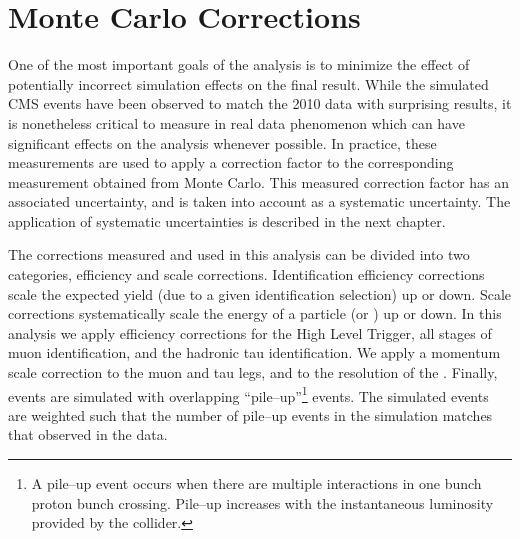 \ifx\master\undefined\fi 
%
\chapter{Monte Carlo Corrections} 
%
\label{ch:corrections} One of the most important goals of the analysis is to
minimize the effect of potentially incorrect simulation effects on the final
result.  While the simulated CMS events have been observed to match the 2010
data with surprising results, it is nonetheless critical to measure in real data
phenomenon which can have significant effects on the analysis whenever possible.
In practice, these measurements are used to apply a correction factor to the
corresponding measurement obtained from Monte Carlo.  This measured correction
factor has an associated uncertainty, and is taken into account as a systematic
uncertainty.  The application of systematic uncertainties is described in the
next chapter.   

The corrections measured and used in this analysis can be divided into two
categories, efficiency and scale corrections. Identification efficiency
corrections scale the expected yield (due to a given identification selection)
up or down.  Scale corrections systematically scale the energy of a particle (or
\MET) up or down.  In this analysis we apply efficiency corrections for the High
Level Trigger, all stages of muon identification, and the hadronic tau
identification.  We apply a momentum scale correction to the muon and tau legs,
and to the resolution of the \MET\@.  Finally, events are simulated with
overlapping ``pile--up''\footnote{A pile--up event occurs when there are
multiple interactions in one bunch proton bunch crossing.  Pile--up increases
with the instantaneous luminosity provided by the collider.} events.  The
simulated events are weighted such that the number of pile--up events in the
simulation matches that observed in the data.


